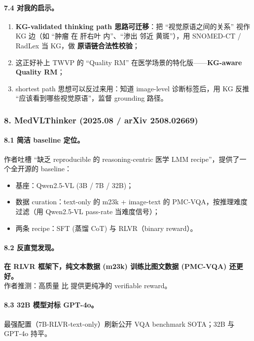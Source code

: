 \paragraph{7.4 对我的启示。}

\begin{enumerate}[leftmargin=1.5em]
  \item \textbf{KG-validated thinking path 思路可迁移}：把 ``视觉原语之间的关系'' 视作 KG 边（如 ``肿瘤 在 肝右叶 内''、``渗出 邻近 黄斑''），用 SNOMED-CT / RadLex 当 KG，做 \textbf{原语链合法性校验}；
  \item 这正好补上 TWVP 的 ``Quality RM'' 在医学场景的特化版——\textbf{KG-aware Quality RM}；
  \item shortest path 思想可以反过来用：知道 image-level 诊断标签后，用 KG 反推 ``应该看到哪些视觉原语''，监督 grounding 路径。
\end{enumerate}

\subsubsection*{8. MedVLThinker (2025.08 / arXiv 2508.02669)}

\paragraph{8.1 简洁 baseline 定位。}
作者吐槽 ``缺乏 reproducible 的 reasoning-centric 医学 LMM recipe''，提供了一个全开源的 baseline：
\begin{itemize}[leftmargin=1.5em]
  \item 基座：Qwen2.5-VL (3B / 7B / 32B)；
  \item 数据 curation：text-only 的 m23k + image-text 的 PMC-VQA，按推理难度过滤（用 Qwen2.5-VL pass-rate 当难度信号）；
  \item 两条 recipe：SFT (蒸馏 CoT) 与 RLVR（binary reward）。
\end{itemize}

\paragraph{8.2 反直觉发现。}
\textbf{在 RLVR 框架下，纯文本数据 (m23k) 训练比图文数据 (PMC-VQA) 还更好。}\\
作者推测：高质量  比  提供更纯净的 verifiable reward。

\paragraph{8.3 32B 模型对标 GPT-4o。}
最强配置（7B-RLVR-text-only）刷新公开 VQA benchmark SOTA；32B 与 GPT-4o 持平。

